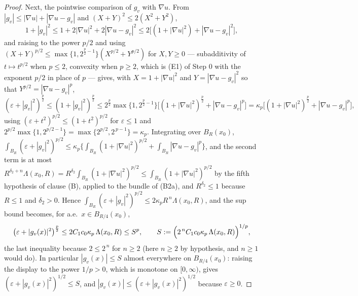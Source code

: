 \begin{proof}
Next, the pointwise comparison of $g_v$ with $\nabla u$.  From
$|g_v|\le|\nabla u|+|\nabla u-g_v|$ and $(X+Y)^2\le2(X^2+Y^2)$,
\[
1+|g_v|^2\le1+2|\nabla u|^2+2|\nabla u-g_v|^2
\le2\bigl[(1+|\nabla u|^2)+|\nabla u-g_v|^2\bigr],
\]
and raising to the power $p/2$ and using
$(X+Y)^{p/2}\le\max\{1,2^{\frac p2-1}\}(X^{p/2}+Y^{p/2})$ for $X,Y\ge0$ ---
subadditivity of $t\mapsto t^{p/2}$ when $p\le2$, convexity when $p\ge2$, which
is (E1) of Step 0 with the exponent $p/2$ in place of $p$ --- gives, with
$X=1+|\nabla u|^2$ and $Y=|\nabla u-g_v|^2$ so that $Y^{p/2}=|\nabla u-g_v|^p$,
\[
(\varepsilon+|g_v|^2)^{\frac p2}\le(1+|g_v|^2)^{\frac p2}
\le2^{\frac p2}\max\{1,2^{\frac p2-1}\}
\bigl[(1+|\nabla u|^2)^{\frac p2}+|\nabla u-g_v|^{p}\bigr]
=\kappa_p\bigl[(1+|\nabla u|^2)^{\frac p2}+|\nabla u-g_v|^{p}\bigr],
\]
using $(\varepsilon+t^2)^{p/2}\le(1+t^2)^{p/2}$ for $\varepsilon\le1$ and
$2^{p/2}\max\{1,2^{p/2-1}\}=\max\{2^{p/2},2^{\,p-1}\}=\kappa_p$.  Integrating
over $B_R(x_0)$,
$\int_{B_R}(\varepsilon+|g_v|^2)^{p/2}\le\kappa_p\{\int_{B_R}(1+|\nabla
u|^2)^{p/2}+\int_{B_R}|\nabla u-g_v|^{p}\}$, and the second term is at most
$R^{\delta_2+n}\Lambda(x_0,R)=R^{\delta_2}\int_{B_R}(1+|\nabla u|^2)^{p/2}
\le\int_{B_R}(1+|\nabla u|^2)^{p/2}$ by the fifth hypothesis of clause (B),
applied to the bundle of (B2a), and $R^{\delta_2}\le1$ because $R\le1$ and
$\delta_2>0$.  Hence
$\int_{B_R}(\varepsilon+|g_v|^2)^{p/2}\le2\kappa_pR^{\,n}\Lambda(x_0,R)$, and
the sup bound becomes, for a.e.\ $x\in B_{R/4}(x_0)$,
\[
\bigl(\varepsilon+|g_v(x)|^2\bigr)^{\frac p2}
\le2C_1c_0\kappa_p\,\Lambda(x_0,R)
\le S^{p},
\qquad
S:=\Bigl(2^{\,n}C_1c_0\kappa_p\,\Lambda(x_0,R)\Bigr)^{1/p},
\]
the last inequality because $2\le2^{\,n}$ for $n\ge2$ (here $n\ge2$ by
hypothesis, and $n\ge1$ would do).
In particular $|g_v(x)|\le S$ almost everywhere on $B_{R/4}(x_0)$: raising the
display to the power $1/p>0$, which is monotone on $[0,\infty)$, gives
$(\varepsilon+|g_v(x)|^2)^{1/2}\le S$, and $|g_v(x)|\le(\varepsilon+|g_v(x)|^2)^{1/2}$
because $\varepsilon\ge0$.


\end{proof}

